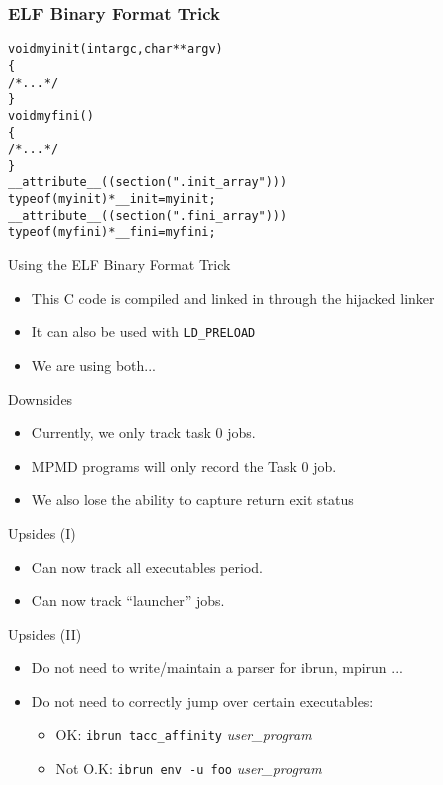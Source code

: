 \documentclass{beamer}
\begin{document}
\begin{frame}[fragile]
    \frametitle{ELF Binary Format Trick}
 {\small
    \begin{alltt}
void myinit(int argc, char **argv)
\{
  /* ... */
\}
void myfini()
\{
  /* ... */
\}
  __attribute__((section(".init_array")))
       typeof(myinit) *__init = myinit;
  __attribute__((section(".fini_array")))
       typeof(myfini) *__fini = myfini;
    \end{alltt}
}
\end{frame}

\begin{frame}{Using the ELF Binary Format Trick}
  \begin{itemize}
    \item This C code is compiled and linked in through the hijacked linker
    \item It can also be used with \texttt{LD\_PRELOAD}
    \item We are using both...
  \end{itemize}
\end{frame}

\begin{frame}{Downsides}
  \begin{itemize}
    \item Currently, we only track task 0 jobs.
    \item MPMD programs will only record the Task 0 job.
    \item We also lose the ability to capture return exit status
  \end{itemize}
\end{frame}

\begin{frame}{Upsides (I)}
  \begin{itemize}
    \item Can now track all executables period.
    \item Can now track ``launcher'' jobs.
  \end{itemize}
\end{frame}

\begin{frame}{Upsides (II)}
  \begin{itemize}
    \item Do not need to write/maintain a parser for ibrun, mpirun ...
    \item Do not need to correctly jump over certain executables:
    \begin{itemize}
      \item OK: \texttt{ibrun tacc\_affinity} \emph{user\_program}
      \item Not O.K: \texttt{ibrun env -u foo} \emph{user\_program}
    \end{itemize}
  \end{itemize}
\end{frame}
\end{document}
